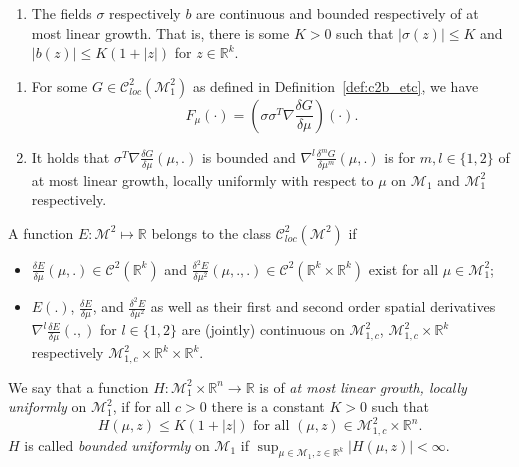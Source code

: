\documentclass[10pt,a4paper]{amsart}
\newcommand{\C}{\mathcal C}
\newcommand{\R}{\mathbb{R}}
\newcommand{\cM}{\mathcal M}
\begin{document}
\begin{assumption}
\label{assumption:interaction} 
 \begin{enumerate}[label=(L.{\arabic*})] \addtocounter{enumi}{4}
 \item \label{interact.L} The fields $\sigma$ respectively $b$ are continuous and bounded respectively of at
   most linear growth. That is, there is some $K>0$ such that $|\sigma(z)|\leq K$ and $|b(z)|\leq K(1+|z|)$
   for $z \in \R^k$.
\end{enumerate}
\begin{enumerate}[label=(F.{\arabic*})]
\item \label{F-F1} %
  For some $G \in \C^2_{loc}(\cM_1^2)$ as defined in Definition~\ref{def:c2b_etc}, we have
  \begin{equation*}
    F_\mu(\cdot) = \left(\sigma \sigma^T\nabla\frac {\delta G }{\delta \mu}\right)(\cdot).
  \end{equation*}
\item \label{F-F2} It holds that $\sigma^ T\nabla \frac {\delta G}{\delta \mu}(\mu,.)$ is bounded and
  $\nabla^l \frac{\delta^m G}{\delta \mu^m}(\mu,.)$ is for
  $m,l\in \{1,2\}$ of at most linear growth, locally uniformly with respect to $\mu$ on $\cM_1$ and
  $\cM^2_1$ respectively.
\end{enumerate}
\end{assumption}

\begin{definition}
  \label{def:c2b_etc}
  A function $E\colon \cM^2 \mapsto \R$ belongs to the class $\C^2_{loc}(\cM^2)$ if
  \begin{itemize}
  \item $\frac{\delta E}{\delta \mu}(\mu,.) \in \C^2(\R^k) $ and
    $\frac{\delta^ 2 E}{\delta \mu^2}(\mu,.,.) \in \C^2(\R^k\times\R^k) $ exist for all $\mu \in \cM^2_1$;
  \item $E(.)$, $\frac{\delta E}{\delta \mu}$, and $\frac{\delta^ 2 E}{\delta \mu^2}$ as well as their first
    and second order spatial derivatives $\nabla^{l}\frac{\delta E}{\delta \mu}(.,)$ for $l\in \{1,2\}$ are
    (jointly) continuous on $\cM^2_{1,c}$, $\cM^2_{1,c}\times \R^k$ respectively $\cM^2_{1,c}\times \R^k\times \R^k$.
  \end{itemize}
  We say that a function $H\colon \cM^2_1\times \R^n \to \R $ is of \emph{at most linear growth, locally
    uniformly} on $\cM^2_1$, if for all $c>0$ there is a constant $K>0$ such that
  \[ H(\mu, z) \leq K (1+ |z|) \mbox{ for all } (\mu,z) \in \cM^2_{1,c} \times \R^n.\]
  $H$  is called \emph{bounded uniformly} on $\cM_1$ if  $\sup_{\mu \in \mathcal M_1, z \in \R^k } |H(\mu,z)| < \infty$. 
\end{definition}
\end{document}
